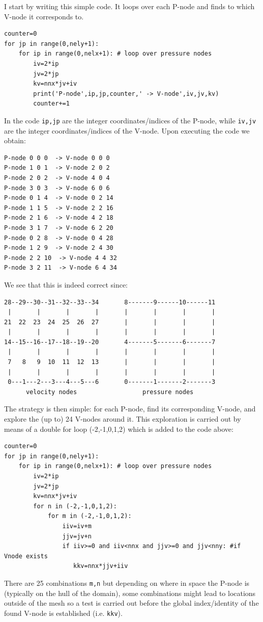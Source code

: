 \noindent I start by writing this simple code. It loops over each 
P-node and finds to which V-node it corresponds to.
\begin{lstlisting}
counter=0
for jp in range(0,nely+1):
    for ip in range(0,nelx+1): # loop over pressure nodes
        iv=2*ip
        jv=2*jp
        kv=nnx*jv+iv
        print('P-node',ip,jp,counter,' -> V-node',iv,jv,kv)
        counter+=1
\end{lstlisting}
In the code \lstinline{ip,jp} are the integer coordinates/indices of the P-node, 
while \lstinline{iv,jv} are the integer coordinates/indices of the V-node.
Upon executing the code we obtain:
{\small
\begin{verbatim}
P-node 0 0 0  -> V-node 0 0 0 
P-node 1 0 1  -> V-node 2 0 2 
P-node 2 0 2  -> V-node 4 0 4 
P-node 3 0 3  -> V-node 6 0 6 
P-node 0 1 4  -> V-node 0 2 14
P-node 1 1 5  -> V-node 2 2 16
P-node 2 1 6  -> V-node 4 2 18
P-node 3 1 7  -> V-node 6 2 20
P-node 0 2 8  -> V-node 0 4 28
P-node 1 2 9  -> V-node 2 4 30
P-node 2 2 10  -> V-node 4 4 32
P-node 3 2 11  -> V-node 6 4 34
\end{verbatim}
}
We see that this is indeed correct since:
\begin{verbatim}
28--29--30--31--32--33--34       8-------9------10------11
 |       |       |       |       |       |       |       |
21  22  23  24  25  26  27       |       |       |       |
 |       |       |       |       |       |       |       |
14--15--16--17--18--19--20       4-------5-------6-------7
 |       |       |       |       |       |       |       |
 7   8   9  10  11  12  13       |       |       |       |
 |       |       |       |       |       |       |       |
 0---1---2---3---4---5---6       0-------1-------2-------3
      velocity nodes                  pressure nodes
\end{verbatim}

The strategy is then simple: for each P-node, find its corresponding V-node, and explore the (up to)
24 V-nodes around it. This exploration is carried out by means of a double for loop (-2,-1,0,1,2) which 
is added to the code above:
\begin{lstlisting}
counter=0
for jp in range(0,nely+1):
    for ip in range(0,nelx+1): # loop over pressure nodes
        iv=2*ip
        jv=2*jp
        kv=nnx*jv+iv
        for n in (-2,-1,0,1,2):
            for m in (-2,-1,0,1,2):
                iiv=iv+m
                jjv=jv+n
                if iiv>=0 and iiv<nnx and jjv>=0 and jjv<nny: #if Vnode exists
                   kkv=nnx*jjv+iiv
\end{lstlisting}
There are 25 combinations \lstinline{m,n} but depending on where in space the P-node is (typically on the hull 
of the domain), some combinations might lead to locations outside of the mesh so a test is carried out 
before the global index/identity of the found V-node is established (i.e. \lstinline{kkv}).

